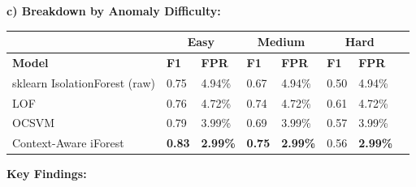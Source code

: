 \textbf{c) Breakdown by Anomaly Difficulty:}

\begin{longtable}{|m{4.5cm}|m{1.2cm}|m{1.2cm}|m{1.2cm}|m{1.2cm}|m{1.2cm}|m{1.2cm}|m{1.2cm}|}
\hline
 & \multicolumn{2}{c|}{\textbf{Easy}} & \multicolumn{2}{c|}{\textbf{Medium}} & \multicolumn{2}{c|}{\textbf{Hard}} \\ \hline
\textbf{Model} & \textbf{F1} & \textbf{FPR} & \textbf{F1} & \textbf{FPR} & \textbf{F1} & \textbf{FPR} \\ \hline
sklearn IsolationForest (raw) & 0.75 & 4.94\% & 0.67 & 4.94\% & 0.50 & 4.94\% \\ \hline
LOF & 0.76 & 4.72\% & 0.74 & 4.72\% & 0.61 & 4.72\% \\ \hline
OCSVM & 0.79 & 3.99\% & 0.69 & 3.99\% & 0.57 & 3.99\% \\ \hline
Context-Aware iForest & \textbf{0.83} & \textbf{2.99\%} & \textbf{0.75} & \textbf{2.99\%} & 0.56 & \textbf{2.99\%} \\ \hline
\end{longtable}

\textbf{Key Findings:}

